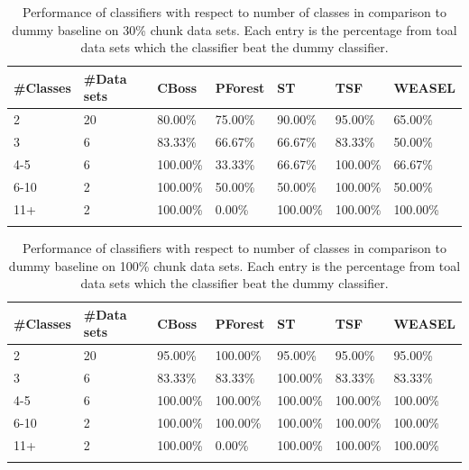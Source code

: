 \begin{table}[!htb]
	\setlength\extrarowheight{2pt} %
	\begin{tabularx}{\textwidth}{|X|X|X|X|X|X|X|}
	\hline
	\textbf{\#Classes} & \textbf{\#Data sets} & \textbf{CBoss} & \textbf{PForest} & \textbf{ST} & \textbf{TSF} & \textbf{WEASEL} \\ \hline
		2 & 20 & 80.00\% & 75.00\% & 90.00\% & 95.00\% & 65.00\% \\ \hline
		3 & 6 & 83.33\% & 66.67\% & 66.67\% & 83.33\% & 50.00\% \\ \hline
		4-5 & 6 & 100.00\% & 33.33\% & 66.67\% & 100.00\% & 66.67\% \\ \hline
		6-10 & 2 & 100.00\% & 50.00\% & 50.00\% & 100.00\% & 50.00\% \\ \hline
		11+ & 2 & 100.00\% & 0.00\% & 100.00\% & 100.00\% & 100.00\% \\ \hline
  \caption{Performance of classifiers with respect to number of classes in comparison to dummy baseline on 30\% chunk data sets. Each entry is the percentage from toal data sets which the classifier beat the dummy classifier.}
  \end{tabularx}
\end{table}

\begin{table}[!htb]
	\setlength\extrarowheight{2pt} %
	\begin{tabularx}{\textwidth}{|X|X|X|X|X|X|X|}
	\hline
	\textbf{\#Classes} & \textbf{\#Data sets} & \textbf{CBoss} & \textbf{PForest} & \textbf{ST} & \textbf{TSF} & \textbf{WEASEL} \\ \hline
		2 & 20 & 95.00\% & 100.00\% & 95.00\% & 95.00\% & 95.00\% \\ \hline
		3 & 6 & 83.33\% & 83.33\% & 100.00\% & 83.33\% & 83.33\% \\ \hline
		4-5 & 6 & 100.00\% & 100.00\% & 100.00\% & 100.00\% & 100.00\% \\ \hline
		6-10 & 2 & 100.00\% & 100.00\% & 100.00\% & 100.00\% & 100.00\% \\ \hline
		11+ & 2 & 100.00\% & 0.00\% & 100.00\% & 100.00\% & 100.00\% \\ \hline
  \caption{Performance of classifiers with respect to number of classes in comparison to dummy baseline on 100\% chunk data sets. Each entry is the percentage from toal data sets which the classifier beat the dummy classifier.}
  \end{tabularx}
\end{table}

